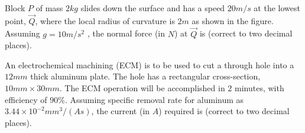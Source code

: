     \item Block $P$ of mass $2 kg$ slides down the surface and has a speed $20 m/s$ at the lowest point, $\vec{Q}$, where the local radius of curvature is $2 m$ as shown in the figure. Assuming $g = 10 m/s^2$  , the normal force (in $N$) at $\vec{Q}$ is \underline{\hspace{1cm}} (correct to two decimal places).
        \begin{figure}[!ht]
            \centering
        \end{figure}

    \item An electrochemical machining (ECM) is to be used to cut a through hole into a $12 mm$ thick aluminum plate. The hole has a rectangular cross-section, $10 mm \times 30 mm$. The ECM operation will be accomplished in $2$ minutes, with efficiency of $90\%$. Assuming specific removal rate for aluminum as $3.44 \times 10^{-2} mm^3 /(A s)$, the current (in $A$) required is \underline{\hspace{1cm}} (correct to two decimal places).
